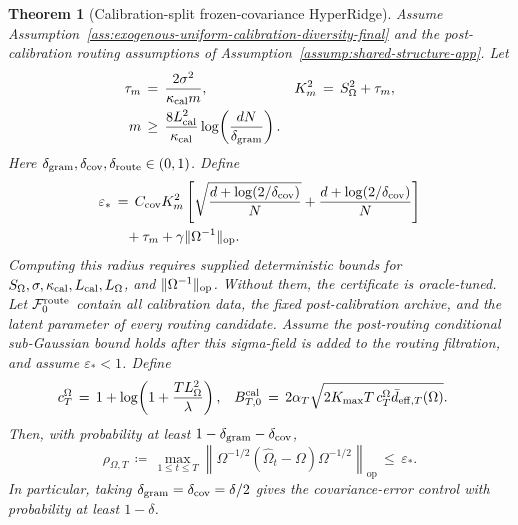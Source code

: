 \documentclass{article} %
\newtheorem{theorem}{Theorem}
\begin{document}
\begin{theorem}[Calibration-split frozen-covariance HyperRidge]
Assume Assumption~\ref{ass:exogenous-uniform-calibration-diversity-final} and
the post-calibration routing assumptions of
Assumption~\ref{assump:shared-structure-app}.  Let
\begin{equation}
\begin{aligned}
\tau_m
&\,=\,
\frac{2\sigma^2}{\kappa_{\rm cal}m},
&
K_m^2
&\,=\,
S_\Omega^2+\tau_m,
\\
m
&\,\geq\,
\frac{8L_{\rm cal}^2}{\kappa_{\rm cal}}
\log\!\left(\frac{dN}{\delta_{\rm gram}}\right).
\end{aligned}
\end{equation}
Here
\(\delta_{\rm gram},\delta_{\rm cov},\delta_{\rm route}\in(0,1)\). Define
\begin{equation}
\begin{aligned}
\varepsilon_*
&\,=\,
C_{\rm cov}K_m^2\left[
\sqrt{\frac{d+\log(2/\delta_{\rm cov})}{N}}
+
\frac{d+\log(2/\delta_{\rm cov})}{N}
\right]
\\
&\quad
+
\tau_m
+
\gamma\|\Omega^{-1}\|_{\mathrm{op}}.
\end{aligned}
\end{equation}
Computing this radius requires supplied deterministic bounds for
\(S_\Omega,\sigma,\kappa_{\rm cal},L_{\rm cal},L_\Omega\), and
\(\|\Omega^{-1}\|_{\rm op}\). Without them, the certificate is oracle-tuned.
Let \(\mathcal F_0^{\rm route}\) contain all calibration data, the fixed
post-calibration archive, and the latent parameter of every routing candidate.
Assume the post-routing conditional sub-Gaussian
bound holds after this sigma-field is added to the routing filtration, and
assume \(\varepsilon_*<1\). Define
\begin{equation}
\begin{aligned}
c_T^\Omega
&\,=\,
1+\log\!\left(1+\frac{TL_\Omega^2}{\lambda}\right),
&
B_{T,0}^{\rm cal}
&\,=\,
2\alpha_T
\sqrt{
2K_{\max}T\,c_T^\Omega
\bar d_{\mathrm{eff},T}(\Omega)
}.
\end{aligned}
\end{equation}
Then, with probability at least
\(1-\delta_{\rm gram}-\delta_{\rm cov}\),
\begin{equation}
\rho_{\Omega,T}
\,\coloneqq\,
\max_{1\le t\le T}
\left\|
\Omega^{-1/2}(\widehat\Omega_t-\Omega)\Omega^{-1/2}
\right\|_{\mathrm{op}}
\,\leq\,
\varepsilon_*.
\end{equation}
In particular, taking \(\delta_{\rm gram}=\delta_{\rm cov}=\delta/2\) gives the
covariance-error control with probability at least \(1-\delta\).


\end{theorem}
\end{document}
